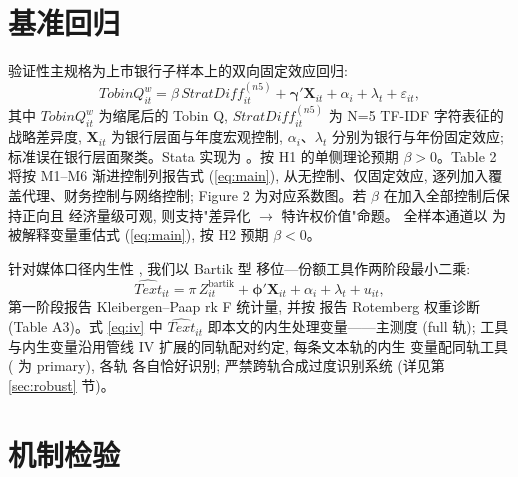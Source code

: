 \section{基准回归}\label{sec:main}

验证性主规格为上市银行子样本上的双向固定效应回归:
\begin{equation}\label{eq:main}
\mathit{TobinQ}^{w}_{it}
  = \beta\,\mathit{StratDiff}^{(n5)}_{it}
  + \boldsymbol{\gamma}'\mathbf{X}_{it}
  + \alpha_i + \lambda_t + \varepsilon_{it},
\end{equation}
其中 $\mathit{TobinQ}^{w}_{it}$ 为缩尾后的 Tobin Q,
$\mathit{StratDiff}^{(n5)}_{it}$ 为 N=5 TF-IDF 字符表征的战略差异度,
$\mathbf{X}_{it}$ 为银行层面与年度宏观控制, $\alpha_i$、$\lambda_t$
分别为银行与年份固定效应; 标准误在银行层面聚类。Stata 实现为
。按 H1 的单侧理论预期
$\beta>0$。Table 2 将按 M1--M6 渐进控制列报告式 (\ref{eq:main}),
从无控制、仅固定效应, 逐列加入覆盖代理、财务控制与网络控制;
Figure 2 为对应系数图。若 $\beta$ 在加入全部控制后保持正向且
经济量级可观, 则支持"差异化 $\to$ 特许权价值"命题。
全样本通道以  为被解释变量重估式
(\ref{eq:main}), 按 H2 预期 $\beta<0$。

针对媒体口径内生性 \parencite{gurun2012hype}, 我们以 Bartik 型
移位—份额工具作两阶段最小二乘:
\begin{equation}\label{eq:iv}
\widehat{\mathit{Text}}_{it}
  = \pi\,Z^{\mathrm{bartik}}_{it}
  + \boldsymbol{\phi}'\mathbf{X}_{it} + \alpha_i + \lambda_t + u_{it},
\end{equation}
第一阶段报告 Kleibergen--Paap rk F 统计量, 并按
\textcite{goldsmith2020bartik} 报告 Rotemberg 权重诊断
(Table A3)。式 \eqref{eq:iv} 中 $\widehat{\mathit{Text}}_{it}$
即本文的内生处理变量——主测度  (full 轨);
工具与内生变量沿用管线 IV 扩展的同轨配对约定, 每条文本轨的内生
变量配同轨工具 ( 为 primary), 各轨
各自恰好识别; 严禁跨轨合成过度识别系统 (详见第 \ref{sec:robust}
节)。

\section{机制检验}\label{sec:mech}

